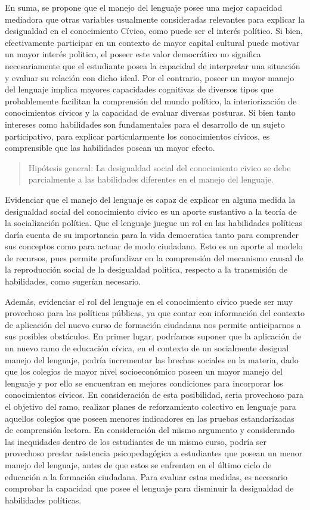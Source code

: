 \documentclass[12pt,twoside]{templates/facsothesis}
\begin{document}
En suma, se propone que el manejo del lenguaje posee una mejor capacidad mediadora que otras variables usualmente consideradas relevantes para explicar la desigualdad en el conocimiento Cívico, como puede ser el interés político. Si bien, efectivamente participar en un contexto de mayor capital cultural puede motivar un mayor interés político, el poseer este valor democrático no significa necesariamente que el estudiante posea la capacidad de interpretar una situación y evaluar su relación con dicho ideal. Por el contrario, poseer un mayor manejo del lenguaje implica mayores capacidades cognitivas de diversos tipos que probablemente facilitan la comprensión del mundo político, la interiorización de conocimientos cívicos y la capacidad de evaluar diversas posturas. Si bien tanto intereses como habilidades son fundamentales para el desarrollo de un sujeto participativo, para explicar particularmente los conocimientos cívicos, es comprensible que las habilidades posean un mayor efecto.

\begin{quote}
Hipótesis general: La desigualdad social del conocimiento civico se debe parcialmente a las habilidades diferentes en el manejo del lenguaje.
\end{quote}

Evidenciar que el manejo del lenguaje es capaz de explicar en alguna medida la desigualdad social del conocimiento cívico es un aporte sustantivo a la teoría de la socialización política. Que el lenguaje juegue un rol en las habilidades políticas daría cuenta de su importancia para la vida democratica tanto para comprender sus conceptos como para actuar de modo ciudadano. Esto es un aporte al modelo de recursos, pues permite profundizar en la comprensión del mecanismo causal de la reproducción social de la desigualdad politica, respecto a la transmisión de habilidades, como \citet{brady_Political_2015} sugerían necesario.

Además, evidenciar el rol del lenguaje en el conocimiento cívico puede ser muy provechoso para las políticas públicas, ya que contar con información del contexto de aplicación del nuevo curso de formación ciudadana nos permite anticiparnos a sus posibles obstáculos. En primer lugar, podríamos suponer que la aplicación de un nuevo ramo de educación cívica, en el contexto de un socialmente desigual manejo del lenguaje, podría incrementar las brechas sociales en la materia, dado que los colegios de mayor nivel socioeconómico poseen un mayor manejo del lenguaje y por ello se encuentran en mejores condiciones para incorporar los conocimientos cívicos. En consideración de esta posibilidad, seria provechoso para el objetivo del ramo, realizar planes de reforzamiento colectivo en lenguaje para aquellos colegios que poseen menores indicadores en las pruebas estandarizadas de comprensión lectora. En consideración del mismo argumento y considerando las inequidades dentro de los estudiantes de un mismo curso, podría ser provechoso prestar asistencia psicopedagógica a estudiantes que posean un menor manejo del lenguaje, antes de que estos se enfrenten en el último ciclo de educación a la formación ciudadana. Para evaluar estas medidas, es necesario comprobar la capacidad que posee el lenguaje para disminuir la desigualdad de habilidades políticas.
\end{document}
